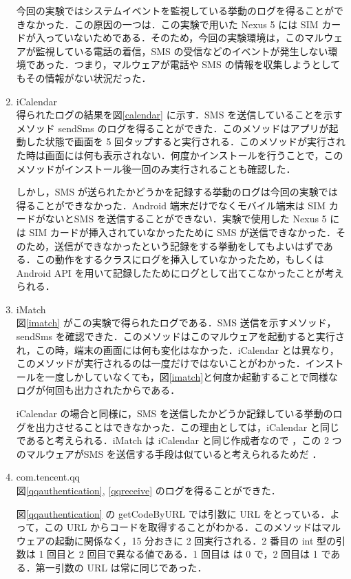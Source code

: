 \begin{enumerate}
	今回の実験ではシステムイベントを監視している挙動のログを得ることができなかった．この原因の一つは．この実験で用いた Nexus 5 には SIM カードが入っていないためである．そのため，今回の実験環境は，このマルウェアが監視している電話の着信，SMS の受信などのイベントが発生しない環境であった．つまり，マルウェアが電話や SMS の情報を収集しようとしてもその情報がない状況だった．
\item iCalendar \mbox{}\\
	得られたログの結果を図\ref{calendar} に示す．SMS を送信していることを示すメソッド sendSms のログを得ることができた．このメソッドはアプリが起動した状態で画面を 5 回タップすると実行される．このメソッドが実行された時は画面には何も表示されない．何度かインストールを行うことで，このメソッドがインストール後一回のみ実行されることも確認した．
	
	しかし，SMS が送られたかどうかを記録する挙動のログは今回の実験では得ることができなかった．Android 端末だけでなくモバイル端末は SIM カードがないとSMS を送信することができない．実験で使用した Nexus 5 には SIM カードが挿入されていなかったために SMS が送信できなかった．そのため，送信ができなかったという記録をする挙動をしてもよいはずである．この動作をするクラスにログを挿入していなかったため，もしくは Android API を用いて記録したためにログとして出てこなかったことが考えられる．
	\item iMatch \mbox{}\\
	図\ref{imatch} がこの実験で得られたログである．SMS 送信を示すメソッド，sendSms を確認できた．このメソッドはこのマルウェアを起動すると実行され，この時，端末の画面には何も変化はなかった．iCalendar とは異なり，このメソッドが実行されるのは一度だけではないことがわかった．インストールを一度しかしていなくても，図\ref{imatch}と何度か起動することで同様なログが何回も出力されたからである．
	
	iCalendar の場合と同様に，SMS を送信したかどうか記録している挙動のログを出力させることはできなかった．この理由としては，iCalendar と同じであると考えられる．iMatch は iCalendar と同じ作成者なので \cite{icalendar}，この 2 つのマルウェアがSMS を送信する手段は似ていると考えられるためだ ．
\item com.tencent.qq \mbox{}\\
	図\ref{qqauthentication},  \ref{qqreceive} のログを得ることができた．
	
	図\ref{qqauthentication} の getCodeByURL では引数に URL をとっている．よって，この URL からコードを取得することがわかる．このメソッドはマルウェアの起動に関係なく，15 分おきに 2 回実行される．2 番目の int 型の引数は 1 回目と 2 回目で異なる値である．1 回目は は 0 で，2 回目は 1 である．第一引数の URL は常に同じであった．
	

\end{enumerate}
